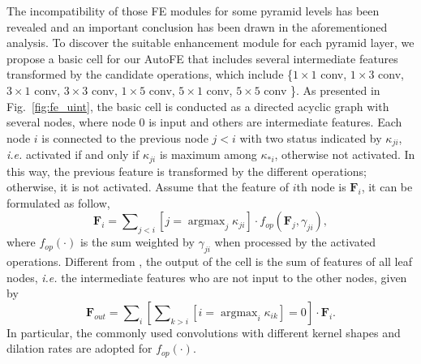 \documentclass[sigconf]{acmart}
\begin{document}
The incompatibility of those FE modules for some pyramid levels has been revealed and an important conclusion has been drawn in the aforementioned analysis.
To discover the suitable enhancement module for each pyramid layer, we propose a basic cell for our AutoFE that includes several intermediate features transformed by the candidate operations, which include \{$1\times 1$ conv, $1\times 3$ conv, $3\times 1$ conv, $3\times 3$ conv, $1\times 5$ conv, $5\times 1$ conv, $5\times 5$ conv \}. As presented in Fig.~\ref{fig:fe_uint}, the basic cell is conducted as a directed acyclic graph with several nodes, where node $0$ is input and others are intermediate features. 
Each node $i$ is connected to the previous node $j\!<\!i$ with two status indicated by $\kappa_{ji}$, \textit{i.e.} activated if and only if $\kappa_{ji}$ is maximum among $\kappa_{\ast i}$, otherwise not activated.
In this way, the previous feature is transformed by the different operations; otherwise, it is not activated. Assume that the feature of $i$th node is $\mathbf{F}_i$, it can be formulated as follow,
\begin{equation}\label{eq:illu_fe_unit}
    \mathbf{F}_i = \sum\nolimits_{j<i} [j\!=\!\mathop{\arg\max}_j \kappa_{ji}]\cdot f_{op}(\mathbf{F}_j, \gamma_{ji}),
\end{equation}
where $f_{op}(\cdot)$ is the sum weighted by $\gamma_{ji}$ when processed by the activated operations. Different from \cite{liu2018darts,xu2019pcdarts}, the output of the cell is the sum of features of all leaf nodes, \textit{i.e.} the intermediate features who are not input to the other nodes, given by
\begin{equation}
    \mathbf{F}_{out} = \sum\nolimits_i \left[\sum\nolimits_{k>i} [i\!=\!\mathop{\arg\max}_i \kappa_{ik}] = 0\right] \cdot \mathbf{F}_i.
\end{equation}
In particular, the commonly used convolutions with different kernel shapes and dilation rates are adopted for $f_{op}(\cdot)$.
\end{document}
